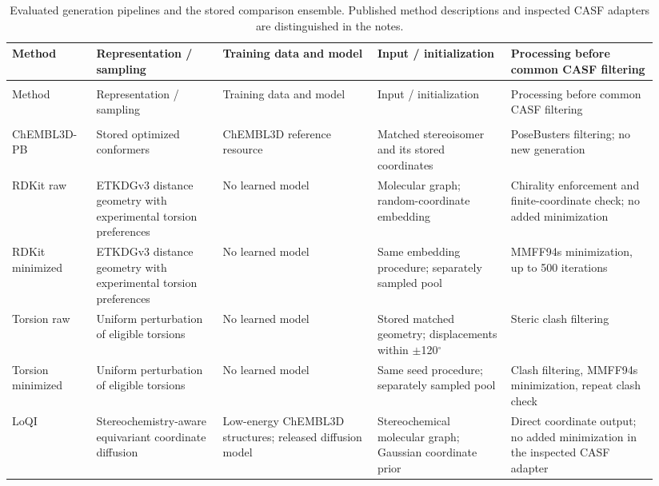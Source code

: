 \begingroup
\setlength{\tabcolsep}{3pt}
\renewcommand{\arraystretch}{1.18}
\footnotesize
\begin{longtable}{@{}>{\raggedright\arraybackslash}p{0.125\linewidth}>{\raggedright\arraybackslash}p{0.18\linewidth}>{\raggedright\arraybackslash}p{0.22\linewidth}>{\raggedright\arraybackslash}p{0.195\linewidth}>{\raggedright\arraybackslash}p{0.215\linewidth}@{}}
\caption{Evaluated generation pipelines and the stored comparison ensemble. Published method descriptions and inspected CASF adapters are distinguished in the notes.}\label{tab:generators}\\
\toprule
Method & Representation / sampling & Training data and model & Input / initialization & Processing before common CASF filtering \\
\midrule
\endfirsthead
\multicolumn{5}{l}{\tablename\ \thetable\ (continued)}\\
\toprule
Method & Representation / sampling & Training data and model & Input / initialization & Processing before common CASF filtering \\
\midrule
\endhead
\midrule
\multicolumn{5}{r}{Continued on the next page}\\
\endfoot
\bottomrule
\endlastfoot
ChEMBL3D-PB\cite{nikitin2025loqi} & Stored optimized conformers & ChEMBL3D reference resource & Matched stereoisomer and its stored coordinates & PoseBusters filtering; no new generation \\[3pt]
RDKit raw\cite{wang2020etkdg} & ETKDGv3 distance geometry with experimental torsion preferences & No learned model & Molecular graph; random-coordinate embedding & Chirality enforcement and finite-coordinate check; no added minimization \\[3pt]
RDKit minimized\cite{wang2020etkdg} & ETKDGv3 distance geometry with experimental torsion preferences & No learned model & Same embedding procedure; separately sampled pool & MMFF94s minimization, up to 500 iterations \\[3pt]
Torsion raw & Uniform perturbation of eligible torsions & No learned model & Stored matched geometry; displacements within $\pm$120$^\circ$ & Steric clash filtering \\[3pt]
Torsion minimized & Uniform perturbation of eligible torsions & No learned model & Same seed procedure; separately sampled pool & Clash filtering, MMFF94s minimization, repeat clash check \\[3pt]
LoQI\cite{nikitin2025loqi} & Stereochemistry-aware equivariant coordinate diffusion & Low-energy ChEMBL3D structures; released diffusion model & Stereochemical molecular graph; Gaussian coordinate prior & Direct coordinate output; no added minimization in the inspected CASF adapter \\[3pt]

\end{longtable}
